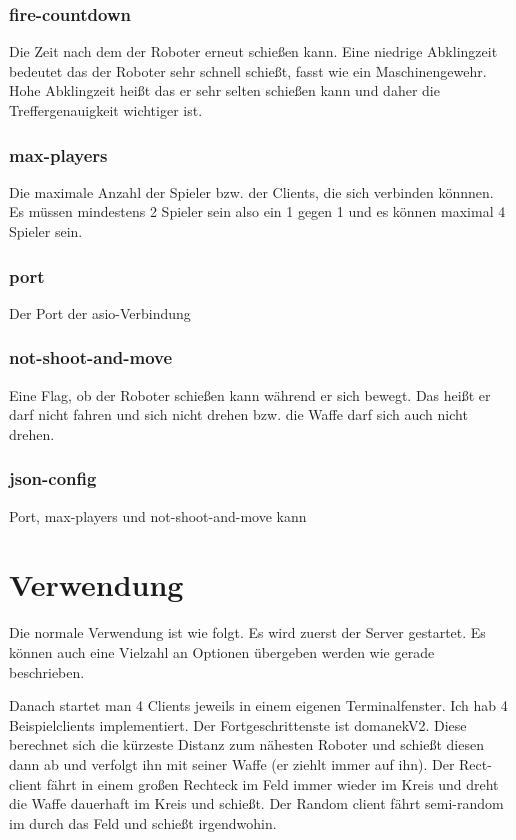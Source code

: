 \documentclass{article}
\begin{document}
\subsubsection{fire-countdown}

Die Zeit nach dem der Roboter erneut schießen kann. Eine niedrige Abklingzeit bedeutet das der Roboter sehr schnell schießt, fasst wie ein Maschinengewehr. Hohe Abklingzeit heißt das er sehr selten schießen kann und daher die Treffergenauigkeit wichtiger ist.

\subsubsection{max-players}

Die maximale Anzahl der Spieler bzw. der Clients, die sich verbinden könnnen. Es müssen mindestens 2 Spieler sein also ein 1 gegen 1 und es können maximal 4 Spieler sein.

\subsubsection{port}

Der Port der asio-Verbindung

\subsubsection{not-shoot-and-move}

Eine Flag, ob der Roboter schießen kann während er sich bewegt. Das heißt er darf nicht fahren und sich nicht drehen bzw. die Waffe darf sich auch nicht drehen.

\subsubsection{json-config}

Port, max-players und not-shoot-and-move kann 

\pagebreak

\section{Verwendung}

Die normale Verwendung ist wie folgt. Es wird zuerst der Server gestartet. Es können auch eine Vielzahl an Optionen übergeben werden wie gerade beschrieben.

Danach startet man 4 Clients jeweils in einem eigenen Terminalfenster. Ich hab 4 Beispielclients implementiert. Der Fortgeschrittenste ist domanekV2. Diese berechnet sich die kürzeste Distanz zum nähesten Roboter und schießt diesen dann ab und verfolgt ihn mit seiner Waffe (er ziehlt immer auf ihn). Der Rect-client fährt in einem großen Rechteck im Feld immer wieder im Kreis und dreht die Waffe dauerhaft im Kreis und schießt. Der Random client fährt semi-random im durch das Feld und schießt irgendwohin.
\end{document}
